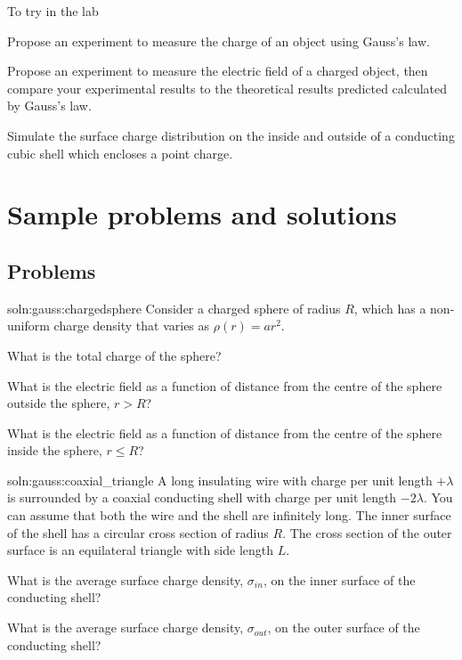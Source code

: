 \begin{chapteractivity}{To try in the lab}
{
\item Propose an experiment to measure the charge of an object using Gauss's law.
\item Propose an experiment to measure the electric field of a charged object, then compare your experimental results to the theoretical results predicted calculated by Gauss's law.
\item Simulate the surface charge distribution on the inside and outside of a conducting cubic shell which encloses a point charge.
}
\end{chapteractivity}

\newpage
\section{Sample problems and solutions}


\subsection{Problems}
\begin{problemParts}{soln:gauss:chargedsphere}{\label{prob:gauss:chargedsphere} 
Consider a charged sphere of radius $R$, which has a non-uniform charge density that varies as $\rho(r) = ar^2$. }
{
\item What is the total charge of the sphere?
\item What is the electric field as a function of distance from the centre of the sphere outside the sphere, $r>R$?
\item What is the electric field as a function of distance from the centre of the sphere inside the sphere, $r\leq R$?
}
\end{problemParts}
\vspace{0.5cm}


\begin{problemParts}{soln:gauss:coaxial_triangle}{\label{prob:gauss:coaxial_triangle} 
A long insulating wire with charge per unit length $+\lambda$ is surrounded by a coaxial conducting shell with charge per unit length $-2\lambda$. You can assume that both the wire and the shell are infinitely long. The inner surface of the shell has a circular cross section of radius $R$. The cross section of the outer surface is an equilateral triangle with side length $L$.}{
\item What is the average surface charge density, $\sigma_{in}$, on the inner surface of the conducting shell?
\item What is the average surface charge density, $\sigma_{out}$, on the outer surface of the conducting shell?
}
\vspace{0.5cm}
\end{problemParts}


